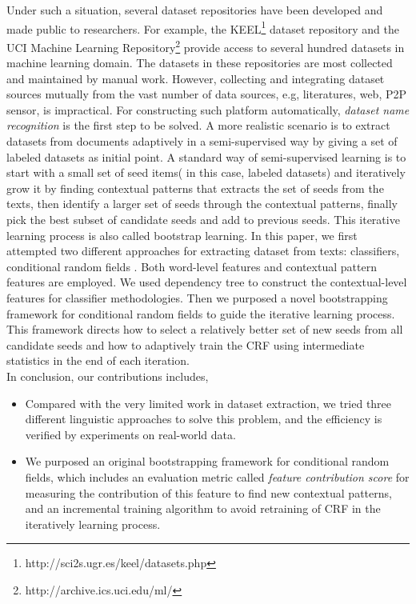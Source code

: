 \documentclass[10pt]{article}
\begin{document}
Under such a situation, several dataset repositories have been developed and made public to researchers. For example, the KEEL\footnote{http://sci2s.ugr.es/keel/datasets.php} dataset repository and the UCI Machine Learning Repository\footnote{http://archive.ics.uci.edu/ml/} provide access to several hundred datasets in machine learning domain. The datasets in these repositories are most collected and maintained by manual work. However, collecting and integrating dataset sources mutually from the vast number of data sources, e.g, literatures, web, P2P sensor, is impractical. For constructing such platform automatically, \emph{dataset name recognition} is the first step to be solved. A more realistic scenario is to extract datasets from documents adaptively in a semi-supervised way by giving a set of labeled datasets as initial point. A standard way of semi-supervised learning is to start with a small set of seed items( in this case, labeled datasets) and iteratively grow it by finding contextual patterns that extracts the set of seeds from the texts, then identify a larger set of seeds through the contextual patterns, finally pick the best subset of candidate seeds and add to previous seeds. This iterative learning process is also called bootstrap learning. In this paper, we first attempted two different approaches for extracting dataset from texts: classifiers, conditional random fields \cite{lafferty2001conditional}. Both word-level features and contextual pattern features are employed. We used dependency tree to construct the contextual-level features for classifier methodologies. Then we purposed a novel bootstrapping framework for conditional random fields to guide the iterative learning process. This framework directs how to select a relatively better set of new seeds from all candidate seeds and how to adaptively train the CRF using intermediate statistics in the end of each iteration. \\

In conclusion, our contributions includes,
\begin{itemize}
\item Compared with the very limited work in dataset extraction, we tried three different linguistic approaches to solve this problem, and the efficiency is verified by experiments on real-world data.
\item We purposed an original bootstrapping framework for conditional random fields, which includes an evaluation metric called \emph{feature contribution score} for measuring the contribution of this feature to find new contextual patterns, and an incremental training algorithm to avoid retraining of CRF in the iteratively learning process. 
\end{itemize}
\end{document}

